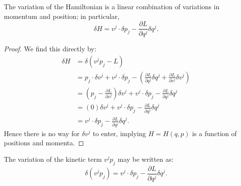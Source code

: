 \begin{theorem}\label{thm:Hamiltonian-depends-on-p-and-q}
The variation of the Hamiltonian is a linear combination of variations
in momentum and position; in particular,
\begin{equation}\label{eq:variation-of-H}
\delta H = v^{j}\cdot\delta p_{j} - \frac{\partial L}{\partial q^{j}}\delta q^{j}.
\end{equation}
\end{theorem}

\begin{proof}
  We find this directly by:
  \begin{subequations}
    \begin{align}
\delta H
&= \delta(v^{j}p_{j} - L)\\
&= p_{j}\cdot\delta v^{j} + v^{j}\cdot\delta p_{j} -
\left(\frac{\partial L}{\partial q^{j}}\delta q^{j} + \frac{\partial L}{\partial v^{j}}\delta v^{j}\right)\\
&= \left(p_{j} - \frac{\partial L}{\partial v^{j}}\right)\delta v^{j}
+ v^{j}\cdot\delta p_{j} - \frac{\partial L}{\partial q^{j}}\delta q^{j}\\
&= (0)\delta v^{j} + v^{j}\cdot\delta p_{j} - \frac{\partial L}{\partial q^{j}}\delta q^{j}\\
&= v^{j}\cdot\delta p_{j} - \frac{\partial L}{\partial q^{j}}\delta q^{j}.
    \end{align}
  \end{subequations}
Hence there is no way for $\delta v^{j}$ to enter, implying $H=H(q,p)$
is a function of positions and momenta.
\end{proof}


\begin{lemma}\label{lemma:variation-of-kinetic-contribution}
  The variation of the kinetic term $v^{j}p_{j}$ may be written as:
  \begin{equation}
\delta(v^{j}p_{j}) = v^{j}\cdot\delta p_{j} -\frac{\partial L}{\partial q^{j}}\delta q^{j}.
  \end{equation}
\end{lemma}

